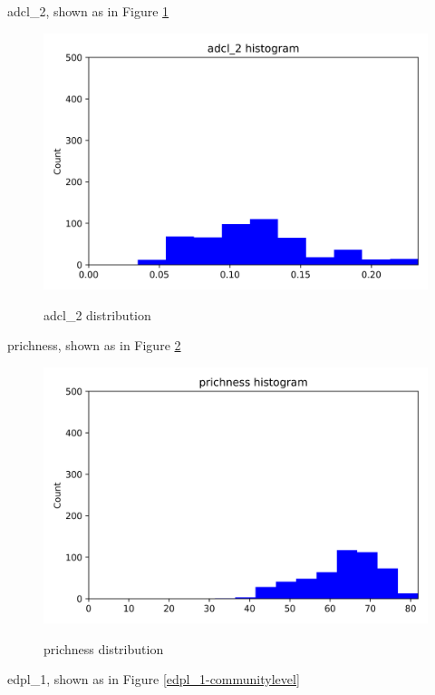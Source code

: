 \documentclass{article}
\begin{document}
adcl_2, shown as in Figure \ref{adcl_2-communitylevel}
\begin{figure}[htbp]
	\centering
	\includegraphics[width=\textwidth, keepaspectratio]{adcl_2-communitylevel.png}\\
	\caption{adcl_2 distribution}
	\label{adcl_2-communitylevel}
\end{figure}
prichness, shown as in Figure \ref{prichness-communitylevel}
\begin{figure}[htbp]
	\centering
	\includegraphics[width=\textwidth, keepaspectratio]{prichness-communitylevel.png}\\
	\caption{prichness distribution}
	\label{prichness-communitylevel}
\end{figure}
edpl_1, shown as in Figure \ref{edpl_1-communitylevel}
\end{document}
